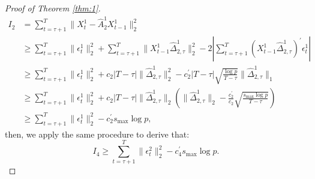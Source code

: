 \documentclass[11pt]{article}
\begin{document}
\begin{proof}[Proof of Theorem \ref{thm:1}]
\begin{align}
    \label{eq:7}
    I_2 
    &= \sum_{t=\tau+1}^T\|X_t^1 - \widehat{A}_2^1X_{t-1}^1\|_2^2 \nonumber \\
    &\geq \sum_{t=\tau+1}^T\|\epsilon_t^1\|_2^2 + \sum_{t=\tau+1}^T\|X_{t-1}^1\widehat{\Delta}_{2,\tau}^1\|_2^2 - 2\left|\sum_{t=\tau+1}^T(X_{t-1}^1\widehat{\Delta}_{2,\tau}^1)^\prime\epsilon_t^1 \right| \nonumber \\
    &\geq \sum_{t=\tau+1}^T\|\epsilon_t^1\|_2^2 + c_2|T-\tau|\|\widehat{\Delta}_{2,\tau}^1\|_2^2 - c_2^\prime|T-\tau|\sqrt{\frac{\log p}{T-\tau}}\|\widehat{\Delta}_{2,\tau}^1\|_1 \nonumber \\
    &\geq \sum_{t=\tau+1}^T\|\epsilon_t^1\|_2^2 + c_2|T-\tau|\|\widehat{\Delta}_{2,\tau}^1\|_2\left(\|\widehat{\Delta}_{2,\tau}^1\|_2 - \frac{c_2^\prime}{c_2}\sqrt{\frac{s_{\max}\log p}{T-\tau}}\right) \nonumber \\
    &\geq \sum_{t=\tau+1}^T\|\epsilon_t^1\|_2^2 - c_2^\prime s_{\max}\log p,
\end{align}
then, we apply the same procedure to derive that:
\begin{equation}
    \label{eq:8}
    I_4 \geq \sum_{t=\tau+1}^T\|\epsilon_t^2\|_2^2 - c_4^\prime s_{\max}\log p.
\end{equation}


\end{proof}
\end{document}
